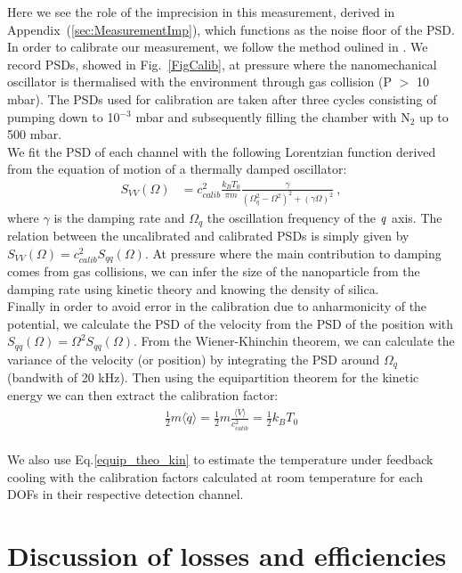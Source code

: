 \documentclass[%
 reprint,
 amsmath,amssymb,
 aps,
pra,
]{revtex4-2}
\begin{document}
Here we see the role of the imprecision in this measurement, derived in Appendix~(\ref{sec:MeasurementImp}), which functions as the noise floor of the PSD.\\
\noindent In order to calibrate our measurement, we follow the method oulined in \cite{hebestreit_calibration_2018}. We record PSDs, showed in Fig.~\ref{FigCalib},  at pressure where the nanomechanical oscillator is thermalised with the environment through gas collision (P $>$ 10 mbar). The PSDs used for calibration are taken after three cycles consisting of pumping down to 10$^{-3}$ mbar and subsequently filling the chamber with N$_2$ up to 500 mbar. \\
We fit the PSD of each channel with the following Lorentzian function derived from the equation of motion of a thermally damped oscillator:
\begin{align}\label{MotionalPSD}
    S_{VV}(\Omega) &= c_{calib}^{2}\frac{k_{B}T_{0}}{\pi m}\frac{\gamma}{\left(\Omega_{q}^{2}-\Omega^{2}\right)^{2} + \left(\gamma\Omega\right)^{2}} ~ ,
\end{align}
where $\gamma$ is the damping rate and $\Omega_{q}$ the oscillation frequency of the $\it{q}$ axis. The relation between the uncalibrated and calibrated PSDs is simply given by $S_{VV}(\Omega) = c_{calib}^{2}S_{qq}(\Omega)$.
At pressure where the main contribution to damping comes from gas collisions, we can infer the size of the nanoparticle from the damping rate using kinetic theory and knowing the density of silica.\\
Finally in order to avoid error in the calibration due to anharmonicity of the potential, we calculate the PSD of the velocity from the PSD of the position with $S_{\dot{q}\dot{q}}(\Omega) = \Omega^{2}S_{qq}(\Omega)$.
From the Wiener-Khinchin theorem, we can calculate the variance of the velocity (or position) by integrating the PSD around $\Omega_{q}$ (bandwith of 20 kHz). Then using the equipartition theorem for the kinetic energy we can then extract the calibration factor:
\begin{align}\label{equip_theo_kin}
    \frac{1}{2}m\langle\dot{q}\rangle=\frac{1}{2}m\frac{\langle\dot{V}\rangle}{c_{calib}^2}=\frac{1}{2}k_BT_{0}
\end{align}
\\
We also use Eq.\ref{equip_theo_kin} to estimate the temperature under feedback cooling with the calibration factors calculated at room temperature for each DOFs in their respective detection channel.

\section{Discussion of losses and efficiencies}\label{sec:DiscussionOfLoss}
\end{document}
